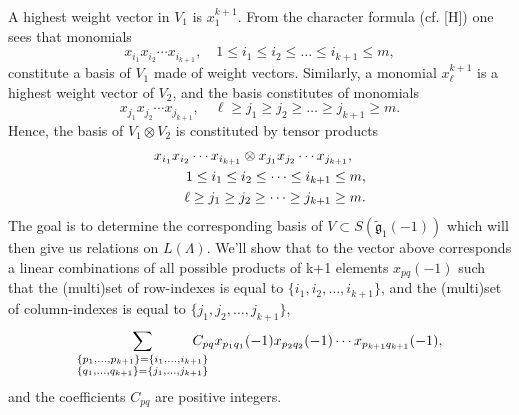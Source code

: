 \documentclass[a4paper, 10pt,oneside]{amsart}
\begin{document}
A highest weight vector in $V_1$ is $x_1^{k+1}$. From the character
formula (cf. [H]) one sees that monomials
$$x_{i_1}x_{i_2}\cdots x_{i_{k+1}},\quad 1\leq i_1 \leq
i_2\leq\dots\leq i_{k+1}\leq m,$$ constitute a basis of $V_1$ made of
weight vectors. Similarly, a monomial
$x_\ell^{k+1}$ is a highest weight vector of $V_2$, and the basis
constitutes of monomials
$$x_{j_1}x_{j_2}\cdots x_{j_{k+1}},\quad \ell\geq j_1 \geq
j_2\geq\dots\geq j_{k+1}\geq m.$$ Hence, the basis of $V_1\otimes
V_2$ is constituted by tensor products
\begin{eqnarray*}
x_{i_1} x_{i_2} \cdots x_{i_{k+1}}\otimes x_{j_1} x_{j_2} \cdots x_{j_{k+1}}, & &\\
 & & \hspace{-50ex}
1\leq
i_1 \leq i_2\leq\dots\leq i_{k+1}\leq m, \\
& & \hspace{-50ex} \ell\geq j_1 \geq j_2\geq\dots\geq j_{k+1}\geq m.
\end{eqnarray*}
The goal is to determine the corresponding basis of $V\subset
S({\tilde{{\mathfrak g}}}_1(-1))$ which will then give us relations on
$L(\Lambda)$. We'll show that to the vector above corresponds a
linear combinations of all possible products of k+1 elements
$x_{pq}(-1)$ such that the (multi)set of row-indexes is equal to
$\{i_1, i_2, \dots, i_{k+1}\}$, and the (multi)set of column-indexes
is equal to $\{j_1, j_2, \dots, j_{k+1} \}$,
\begin{equation} \label{erel4_jed}
\sum_{\substack{\{p_1,\dots,p_{k+1}\}=\{i_1,\dots,i_{k+1}\}
\\\{q_1,\dots,q_{k+1}\}=\{j_1,\dots,j_{k+1}\} }} \hspace{-3ex}
C_{pq} x_{p_1 q_1}(-1) x_{p_2 q_2}(-1) \cdots x_{p_{k+1}
q_{k+1}}(-1),\end{equation} and the coefficients $C_{pq}$ are
positive integers.
\end{document}
